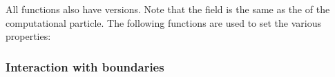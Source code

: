 \documentclass[letterpaper,10pt,english]{sphinxmanual}
\begin{document}
\sphinxAtStartPar
All functions also have  versions.
Note that the field  is the same as the  of the computational particle.
The following functions are used to set the various properties:

\begin{sphinxVerbatim}[commandchars=\\\{\},formatcom=\scriptsize]
  
  
  
  
\end{sphinxVerbatim}


\subsubsection{Interaction with boundaries}
\label{\detokenize{Solvers/RTE:interaction-with-boundaries}}
\end{document}
